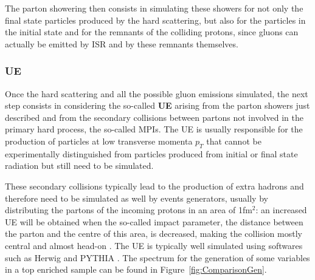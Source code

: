 \documentclass[a4paper, 10pt, openright]{report}
\begin{document}
The parton showering then consists in simulating these showers for not only the final state particles produced by the hard scattering, but also for the particles in the initial state and for the remnants of the colliding protons, since gluons can actually be emitted by \acf{ISR} and by these remnants themselves.

\subsubsection*{\acf{UE}}

Once the hard scattering and all the possible gluon emissions simulated, the next step consists in considering the so-called \textbf{\acf{UE}} arising from the parton showers just described and from the secondary collisions between partons not involved in the primary hard process, the so-called \acp{MPI}. The \ac{UE} is usually responsible for the production of particles at low transverse momenta $p_T$ that cannot be experimentally distinguished from particles produced from initial or final state radiation but still need to be simulated.

These secondary collisions typically lead to the production of extra hadrons and therefore need to be simulated as well by events generators, usually by distributing the partons of the incoming protons in an area of 1fm$^2$: an increased \ac{UE} will be obtained when the so-called impact parameter, the distance between the parton and the centre of this area, is decreased, making the collision mostly central and almost head-on \cite{UE}. The \ac{UE} is typically well simulated using softwares such as Herwig \cite{Herwig} and PYTHIA \cite{PYTHIA}. The spectrum for the generation of some variables in a top enriched sample can be found in Figure~\ref{fig:ComparisonGen}.
\end{document}
